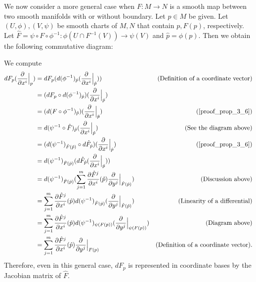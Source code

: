 \begin{rem}
  We now consider a more general case when $F: M \rightarrow N$ is a smooth map between two smooth manifolds with or without boundary.
  Let $p \in M$ be given.
  Let $(U, \phi), (V, \psi)$ be smooth charts of $M, N$ that contain $p, F(p)$, respectively.
  Let $\hat{F} = \psi \circ F \circ \phi^{-1}: \phi(U \cap F^{-1}(V)) \rightarrow \psi(V)$ and $\hat{p} = \phi(p)$.
  Then we obtain the following commutative diagram:

  \begin{center}
  \end{center}

  We compute
  \begin{align*}
    dF_p(\frac{\partial}{\partial x^i}\Big\vert_p)
      &= dF_p(d(\phi^{-1})_{\hat{p}}(\frac{\partial}{\partial x^i}\Big\vert_{\hat{p}})) & \text{(Definition of a coordinate vector)} \\
      &= (dF_p \circ d(\phi^{-1})_{\hat{p}})(\frac{\partial}{\partial x^i}\Big\vert_{\hat{p}}) \\
      &= (d(F \circ \phi^{-1})_{\hat{p}})(\frac{\partial}{\partial x^i}\Big\vert_{\hat{p}}) & (\ref{proof_prop_3_6}) \\
      &= d(\psi^{-1} \circ \hat{F})_{\hat{p}}(\frac{\partial}{\partial x^i}\Big\vert_{\hat{p}}) & \text{(See the diagram above)} \\
      &= (d(\psi^{-1})_{\hat{F}(\hat{p})} \circ d\hat{F}_{\hat{p}})(\frac{\partial}{\partial x^i}\Big\vert_{\hat{p}}) & (\ref{proof_prop_3_6}) \\
      &= d(\psi^{-1})_{\hat{F}(\hat{p})}(d\hat{F}_{\hat{p}}(\frac{\partial}{\partial x^i}\Big\vert_{\hat{p}})) \\
      &= d(\psi^{-1})_{\hat{F}(\hat{p})}(\sum_{j=1}^{m} \frac{\partial \hat{F}^j}{\partial x^i}(\hat{p})\frac{\partial}{\partial y^j}\Big\vert_{\hat{F}(\hat{p})}) & (\text{Discussion above})\\
      &= \sum_{j=1}^{m} \frac{\partial \hat{F}^j}{\partial x^i}(\hat{p}) d(\psi^{-1})_{\hat{F}(\hat{p})}(\frac{\partial}{\partial y^j}\Big\vert_{\hat{F}(\hat{p})}) & (\text{Linearity of a differential})\\
      &= \sum_{j=1}^{m} \frac{\partial \hat{F}^j}{\partial x^i}(\hat{p}) d(\psi^{-1})_{\psi(F(p))}(\frac{\partial}{\partial y^j}\Big\vert_{\psi(F(p))}) & (\text{Diagram above})\\
      &= \sum_{j=1}^{m} \frac{\partial \hat{F}^j}{\partial x^i}(\hat{p}) \frac{\partial}{\partial y^j} \Big\vert_{F(p)} & (\text{Definition of a coordinate vector}).
  \end{align*}
  Therefore, even in this general case, $dF_p$ is represented in coordinate bases by the Jacobian matrix of $\hat{F}$.
\end{rem}

